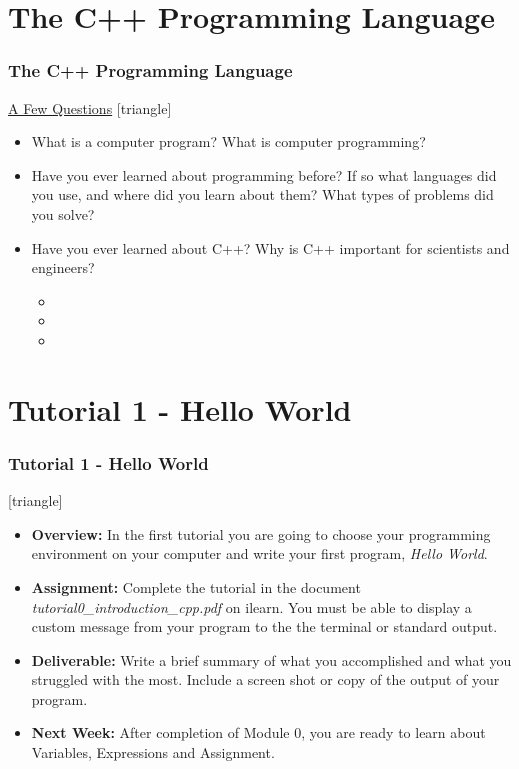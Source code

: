 \documentclass[fleqn]{beamer} %
\newcommand{\MNUM}{0\hspace{2mm}} %
\newcommand{\sectiontitleIV}{The C++ Programming Language}
\newcommand{\sectiontitleV}{Tutorial 1 - Hello World}
\begin{document}
\section{\sectiontitleIV}	
	\begin{frame}[label=sectionIV] \small
		\frametitle{\sectiontitleIV}    
		
		\underline{A Few Questions}
		[triangle]
		\begin{itemize}
			
			\item What is a computer program? What is computer programming?
			
			\item Have you ever learned about programming before? If so what languages did you use, and where did you learn about them? What types of problems did you solve?
			
			\item Have you ever learned about C++? Why is C++ important for scientists and engineers? 
				\begin{itemize}
					\item 
					\item
					\item
				\end{itemize}
			
			
		\end{itemize}
	\end{frame}

\section{\sectiontitleV}	
	            \begin{frame}[label=sectionV] \small
		\frametitle{\sectiontitleV}    
	
 [triangle]
                \begin{itemize}

					\item {\bf Overview:} In the first tutorial you are going to choose your programming environment on your computer and write your first program, {\it Hello World}.  		

					\item {\bf Assignment:} Complete the tutorial in the document {\it tutorial\MNUM\_introduction\_cpp.pdf } on ilearn. You must be able to display a custom message from your program to the the terminal or standard output.
                    
                    \item {\bf Deliverable:} Write a brief summary of what you accomplished and what you struggled with the most. Include a screen shot or copy of the output of your program.   
    
                    \item {\bf Next Week:} After completion of Module \MNUM, you are ready to learn about Variables, Expressions and Assignment. \vspc
                    
       
                \end{itemize}
		\end{frame}
\end{document}

